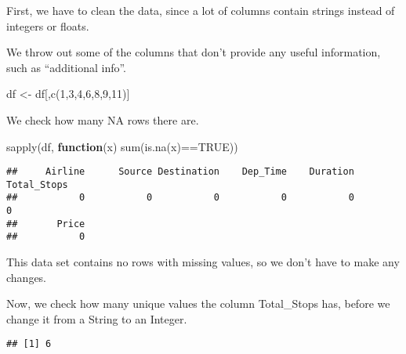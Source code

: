 \documentclass[
]{article}
\newenvironment{Shaded}{\begin{snugshade}}{\end{snugshade}}
\newcommand{\ConstantTok}[1]{\textcolor[rgb]{0.00,0.00,0.00}{#1}}
\newcommand{\ControlFlowTok}[1]{\textcolor[rgb]{0.13,0.29,0.53}{\textbf{#1}}}
\newcommand{\DecValTok}[1]{\textcolor[rgb]{0.00,0.00,0.81}{#1}}
\newcommand{\FunctionTok}[1]{\textcolor[rgb]{0.00,0.00,0.00}{#1}}
\newcommand{\NormalTok}[1]{#1}
\newcommand{\OtherTok}[1]{\textcolor[rgb]{0.56,0.35,0.01}{#1}}
\newcommand{\SpecialCharTok}[1]{\textcolor[rgb]{0.00,0.00,0.00}{#1}}
\begin{document}
First, we have to clean the data, since a lot of columns contain strings
instead of integers or floats.

We throw out some of the columns that don't provide any useful
information, such as ``additional info''.

\begin{Shaded}
\begin{Highlighting}[]
\NormalTok{df }\OtherTok{\textless{}{-}}\NormalTok{ df[,}\FunctionTok{c}\NormalTok{(}\DecValTok{1}\NormalTok{,}\DecValTok{3}\NormalTok{,}\DecValTok{4}\NormalTok{,}\DecValTok{6}\NormalTok{,}\DecValTok{8}\NormalTok{,}\DecValTok{9}\NormalTok{,}\DecValTok{11}\NormalTok{)]}
\end{Highlighting}
\end{Shaded}

We check how many NA rows there are.

\begin{Shaded}
\begin{Highlighting}[]
\FunctionTok{sapply}\NormalTok{(df, }\ControlFlowTok{function}\NormalTok{(x) }\FunctionTok{sum}\NormalTok{(}\FunctionTok{is.na}\NormalTok{(x)}\SpecialCharTok{==}\ConstantTok{TRUE}\NormalTok{))}
\end{Highlighting}
\end{Shaded}

\begin{verbatim}
##     Airline      Source Destination    Dep_Time    Duration Total_Stops 
##           0           0           0           0           0           0 
##       Price 
##           0
\end{verbatim}

This data set contains no rows with missing values, so we don't have to
make any changes.

Now, we check how many unique values the column Total\_Stops has, before
we change it from a String to an Integer.

\begin{Shaded}
\end{Shaded}

\begin{verbatim}
## [1] 6
\end{verbatim}

\begin{Shaded}
\end{Shaded}
\end{document}
